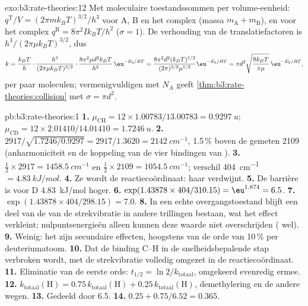 \begin{solution}{exo:b3:rate-theories:12}
Met moleculaire toestandssommen per volume-eenheid: $q^{\mathrm T}/V = (2\pi mk_BT)^{3/2}/h^3$ voor
A, B en het complex (massa $m_{\mathrm A} + m_{\mathrm B}$), en voor het complex $q^{\mathrm R} = 8\pi^2Ik_BT/h^2$
($\sigma = 1$). De verhouding van de translatiefactoren is $h^3/(2\pi\mu k_BT)^{3/2}$, dus
\[
  k = \frac{k_BT}{h}\cdot\frac{h^3}{(2\pi\mu k_BT)^{3/2}}\cdot\frac{8\pi^2\mu d^2k_BT}{h^2}\,\eu^{-E_0/RT}
    = \frac{8\pi^2d^2(k_BT)^{1/2}}{(2\pi)^{3/2}\mu^{1/2}}\eu^{-E_0/RT}
    = \pi d^2\sqrt{\frac{8k_BT}{\pi\mu}}\,\eu^{-E_0/RT},
\]
per paar moleculen; vermenigvuldigen met $N_A$ geeft \cref{thm:b3:rate-theories:collision}
met $\sigma = \pi d^2$.
\end{solution}

\begin{solution}{pb:b3:rate-theories:1}
\textbf{1.} $\mu_{\mathrm{CH}} = 12 \times 1.00783/13.00783 = \qty{0.9297}{u}$; $\mu_{\mathrm{CD}} = 12 \times 2.01410/14.01410 =
\qty{1.7246}{u}$.
\textbf{2.} $2917/\sqrt{1.7246/0.9297} = 2917/1.3620 = \qty{2142}{cm^{-1}}$,
1.5\,\% boven de gemeten 2109 (anharmoniciteit en de koppeling van de vier
bindingen van ).
\textbf{3.} $\frac12 \times 2917 = \qty{1458.5}{cm^{-1}}$ en $\frac12 \times 2109 = \qty{1054.5}{cm^{-1}}$; verschil
\qty{404}{cm^{-1}} $= \qty{4.83}{kJ/mol}$.
\textbf{4.} Ze wordt de reactiecoördinaat: haar  verdwijnt.
\textbf{5.} De barrière is voor D \qty{4.83}{kJ/mol} hoger.
\textbf{6.} $\exp(1.43878 \times 404/310.15) = \eu^{1.874} = 6.5$.
\textbf{7.} $\exp(1.43878 \times 404/298.15) = 7.0$.
\textbf{8.} In een echte overgangstoestand blijft een deel van de
 van de strekvibratie in andere trillingen bestaan, wat het
effect verkleint; nulpuntsenergieën alleen kunnen deze waarde niet
overschrijden ( wel).
\textbf{9.} Weinig: het zijn secundaire effecten, hoogstens van de orde van
10\,\% per deuteriumatoom.
\textbf{10.} Dat de binding C--H in de snelheidsbepalende stap verbroken
wordt, met de strekvibratie volledig omgezet in de reactiecoördinaat.
\textbf{11.} Eliminatie van de eerste orde: $t_{1/2} = \ln2/k_{\mathrm{totaal}}$,
omgekeerd evenredig ermee.
\textbf{12.} $k_{\mathrm{totaal}}(\mathrm H) = 0.75\,k_{\mathrm{totaal}}(\mathrm H) + 0.25\,k_{\mathrm{totaal}}(\mathrm H)$, demethylering en de andere wegen.
\textbf{13.} Gedeeld door 6.5.
\textbf{14.} $0.25 + 0.75/6.52 = 0.365$.

\end{solution}
